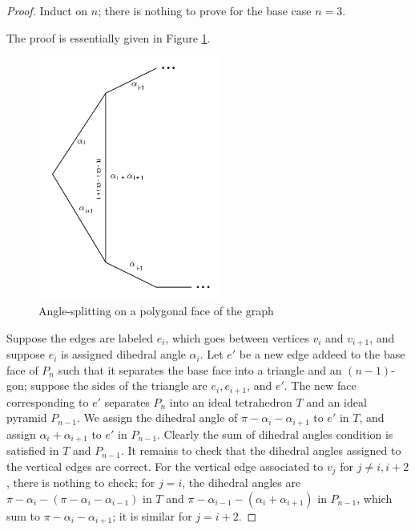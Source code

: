 \documentclass[11pt]{amsart}
\theoremstyle{plain}
\theoremstyle{definition}
\begin{document}
\begin{proof}
Induct on $n$; there is nothing to prove for the base case $n=3$.

The proof is essentially given in Figure \ref{f:ideal_pyramid_arg}.

\begin{figure}
\includegraphics[height=8cm]{more_pictures/angle_split.png}
\caption{Angle-splitting on a polygonal face of the graph}
\label{f:ideal_pyramid_arg}
\end{figure}


Suppose the edges are labeled $e_i$,
which goes between vertices $v_i$ and $v_{i+1}$,
and suppose $e_i$ is assigned dihedral angle $\alpha_i$.
Let $e'$ be a new edge addeed to the base face of $P_n$
such that it separates the base face into a triangle and
an $(n-1)$-gon;
suppose the sides of the triangle are
$e_i, e_{i+1}$, and $e'$.
The new face corresponding to $e'$ separates $P_n$ into
an ideal tetrahedron $T$ and an ideal pyramid $P_{n-1}$.
We assign the dihedral angle of $\pi - \alpha_i - \alpha_{i+1}$
to $e'$ in $T$, and assign $\alpha_i + \alpha_{i+1}$ to $e'$ in $P_{n-1}$.
Clearly the sum of dihedral angles condition is satisfied
in $T$ and $P_{n-1}$.
It remains to check that the dihedral angles assigned to the vertical edges
are correct.
For the vertical edge associated to $v_j$ for $j \neq i, i+2$,
there is nothing to check;
for $j = i$, the dihedral angles are
$\pi - \alpha_i - (\pi - \alpha_i - \alpha_{i-1})$
in $T$ and $\pi - \alpha_{i-1} - (\alpha_i + \alpha_{i+1})$ in $P_{n-1}$,
which sum to $\pi - \alpha_i - \alpha_{i+1}$;
it is similar for $j = i+2$.

\end{proof}




\end{document}
